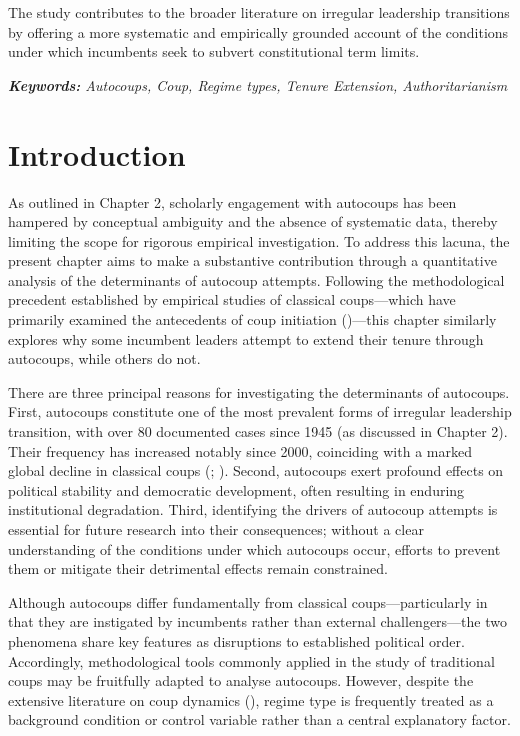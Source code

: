 \documentclass[
  12pt,
]{report}
\begin{document}
The study contributes to the broader literature on irregular leadership
transitions by offering a more systematic and empirically grounded
account of the conditions under which incumbents seek to subvert
constitutional term limits.

\emph{\textbf{Keywords:} Autocoups, Coup, Regime types, Tenure
Extension, Authoritarianism}

\newpage

\section{Introduction}\label{introduction-2}

As outlined in Chapter 2, scholarly engagement with autocoups has been
hampered by conceptual ambiguity and the absence of systematic data,
thereby limiting the scope for rigorous empirical investigation. To
address this lacuna, the present chapter aims to make a substantive
contribution through a quantitative analysis of the determinants of
autocoup attempts. Following the methodological precedent established by
empirical studies of classical coups---which have primarily examined the
antecedents of coup initiation ()---this chapter similarly explores why some
incumbent leaders attempt to extend their tenure through autocoups,
while others do not.

There are three principal reasons for investigating the determinants of
autocoups. First, autocoups constitute one of the most prevalent forms
of irregular leadership transition, with over 80 documented cases since
1945 (as discussed in Chapter 2). Their frequency has increased notably
since 2000, coinciding with a marked global decline in classical coups
(; ). Second, autocoups exert profound effects on political
stability and democratic development, often resulting in enduring
institutional degradation. Third, identifying the drivers of autocoup
attempts is essential for future research into their consequences;
without a clear understanding of the conditions under which autocoups
occur, efforts to prevent them or mitigate their detrimental effects
remain constrained.

Although autocoups differ fundamentally from classical
coups---particularly in that they are instigated by incumbents rather
than external challengers---the two phenomena share key features as
disruptions to established political order. Accordingly, methodological
tools commonly applied in the study of traditional coups may be
fruitfully adapted to analyse autocoups. However, despite the extensive
literature on coup dynamics (), regime type is frequently treated as a
background condition or control variable rather than a central
explanatory factor.
\end{document}
